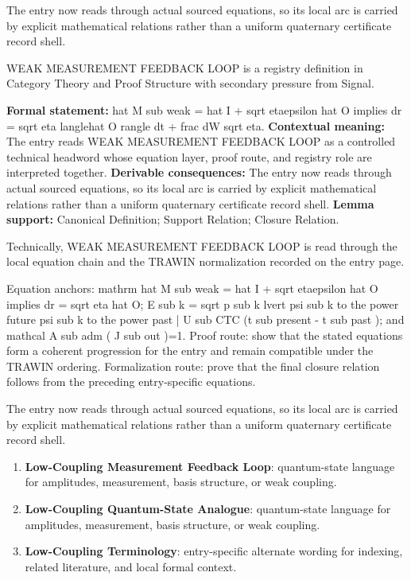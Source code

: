 The entry now reads through actual sourced equations, so its local arc is carried by explicit mathematical relations rather than a uniform quaternary certificate record shell.
\clearpage


\begingroup\small
{}
WEAK MEASUREMENT FEEDBACK LOOP is a registry definition in Category Theory and Proof Structure with secondary pressure from Signal.

\begingroup\footnotesize\setlength{\emergencystretch}{3em}\sloppy
\textbf{Formal statement:} hat M sub weak = hat I + sqrt etaepsilon hat O implies dr = sqrt eta langlehat O rangle dt + frac dW sqrt eta. \textbf{Contextual meaning:} The entry reads WEAK MEASUREMENT FEEDBACK LOOP as a controlled technical headword whose equation layer, proof route, and registry role are interpreted together. \textbf{Derivable consequences:} The entry now reads through actual sourced equations, so its local arc is carried by explicit mathematical relations rather than a uniform quaternary certificate record shell. \textbf{Lemma support:} Canonical Definition; Support Relation; Closure Relation.\par
\endgroup

Technically, WEAK MEASUREMENT FEEDBACK LOOP is read through the local equation chain and the TRAWIN normalization recorded on the entry page.

Equation anchors: mathrm hat M sub weak = hat I + sqrt etaepsilon hat O implies dr = sqrt eta hat O; E sub k = sqrt p sub k lvert psi sub k to the power future psi sub k to the power past | U sub CTC (t sub present - t sub past ); and mathcal A sub adm ( J sub out )=1. Proof route: show that the stated equations form a coherent progression for the entry and remain compatible under the TRAWIN ordering. Formalization route: prove that the final closure relation follows from the preceding entry-specific equations.

The entry now reads through actual sourced equations, so its local arc is carried by explicit mathematical relations rather than a uniform quaternary certificate record shell.
\endgroup

\begin{enumerate}[leftmargin=1.6em,itemsep=6pt,topsep=4pt]
\item \textbf{Low-Coupling Measurement Feedback Loop}: quantum-state language for amplitudes, measurement, basis structure, or weak coupling.
\item \textbf{Low-Coupling Quantum-State Analogue}: quantum-state language for amplitudes, measurement, basis structure, or weak coupling.
\item \textbf{Low-Coupling Terminology}: entry-specific alternate wording for indexing, related literature, and local formal context.
\end{enumerate}

